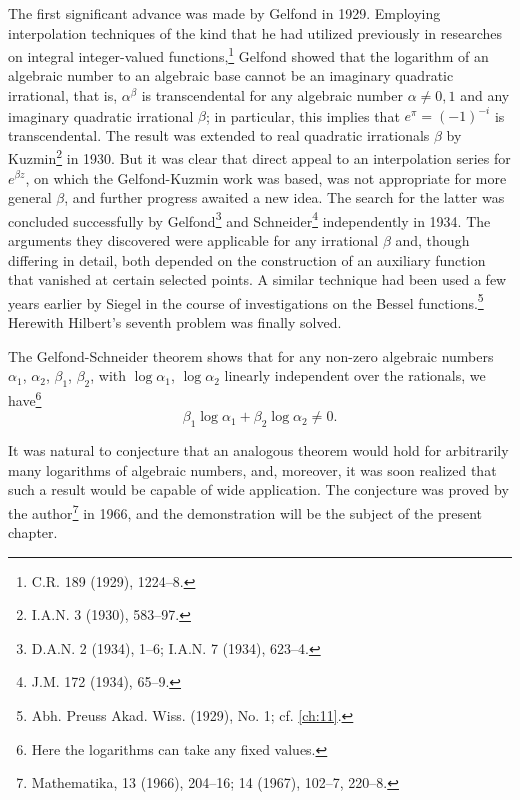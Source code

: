 The first significant advance was made by Gelfond in 1929. Employing interpolation techniques of the kind that he had utilized previously in researches on integral integer-valued functions,\footnote{C.R. 189 (1929), 1224--8.} Gelfond showed that the logarithm of an algebraic number to an algebraic base cannot be an imaginary quadratic irrational, that is, $\alpha^{\beta}$ is transcendental for any algebraic number $\alpha \neq 0, 1$ and any imaginary quadratic irrational $\beta$; in particular, this implies that $e^{\pi} = (-1)^{-i}$ is transcendental. The result was extended to real quadratic irrationals $\beta$ by Kuzmin\footnote{I.A.N. 3 (1930), 583--97.} in 1930. But it was clear that direct appeal to an interpolation series for $e^{\beta z}$, on which the Gelfond-Kuzmin work was based, was not appropriate for more general $\beta$, and further progress awaited a new idea. The search for the latter was concluded successfully by Gelfond\footnote{D.A.N. 2 (1934), 1--6; I.A.N. 7 (1934), 623--4.} and Schneider\footnote{J.M. 172 (1934), 65--9.} independently in 1934. The arguments they discovered were applicable for any irrational $\beta$ and, though differing in detail, both depended on the construction of an auxiliary function that vanished at certain selected points. A similar technique had been used a few years earlier by Siegel in the course of investigations on the Bessel functions.\footnote{Abh. Preuss Akad. Wiss. (1929), No. 1; cf. \autoref{ch:11}.} Herewith Hilbert's seventh problem was finally solved.

The Gelfond-Schneider theorem shows that for any non-zero algebraic numbers $\alpha_1$, $\alpha_2$, $\beta_1$, $\beta_2$, with $\log \alpha_1$, $\log \alpha_2$ linearly independent over the rationals, we have\footnote{Here the logarithms can take any fixed values.}
\[
\beta_1 \log \alpha_1 + \beta_2 \log \alpha_2 \neq 0.
\]

It was natural to conjecture that an analogous theorem would hold for arbitrarily many logarithms of algebraic numbers, and, moreover, it was soon realized that such a result would be capable of wide application. The conjecture was proved by the author\footnote{Mathematika, 13 (1966), 204--16; 14 (1967), 102--7, 220--8.} in 1966, and the demonstration will be the subject of the present chapter.

